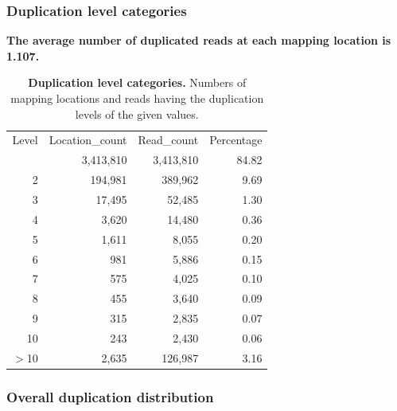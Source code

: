 \documentclass{article}
\begin{document}
\subsubsection{Duplication level categories}
\textbf{The average number of duplicated reads at each mapping location is 1.107.}
\begin{table}
\begin{tabular}{|r|r|r|r|}
  \hline
Level & Location\_count & Read\_count & Percentage \\ 
  \rowcolor[gray]{0.9} \hline
1 & 3,413,810 & 3,413,810 & 84.82 \\ 
  2 & 194,981 & 389,962 &  9.69 \\ 
   \rowcolor[gray]{0.9}3 & 17,495 & 52,485 &  1.30 \\ 
  4 & 3,620 & 14,480 &  0.36 \\ 
   \rowcolor[gray]{0.9}5 & 1,611 & 8,055 &  0.20 \\ 
  6 & 981 & 5,886 &  0.15 \\ 
   \rowcolor[gray]{0.9}7 & 575 & 4,025 &  0.10 \\ 
  8 & 455 & 3,640 &  0.09 \\ 
   \rowcolor[gray]{0.9}9 & 315 & 2,835 &  0.07 \\ 
  10 & 243 & 2,430 &  0.06 \\ 
   \rowcolor[gray]{0.9}$>$10 & 2,635 & 126,987 &  3.16 \\ 
   \hline
\end{tabular}\caption{\textbf{Duplication level categories.} Numbers of mapping locations and reads having the duplication levels of the given values.}
\end{table}

\subsubsection{Overall duplication distribution}
\end{document}
